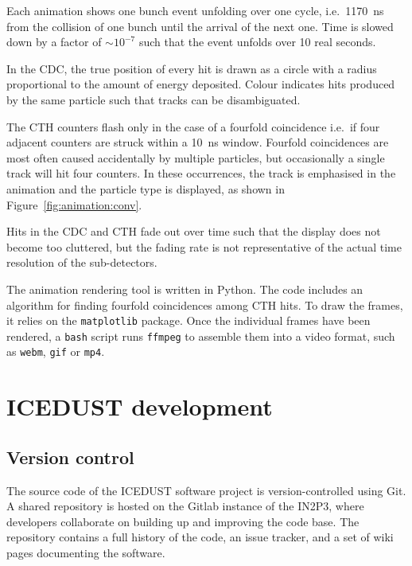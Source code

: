 Each animation shows one bunch event unfolding over one cycle, i.e.\
\SI{1170}{\ns} from the collision of one bunch until the arrival of the next
one. Time is slowed down by a factor of ${\sim}10^{-7}$ such that the event
unfolds over 10 real seconds.

In the CDC, the true position of every hit is drawn as a circle with a radius
proportional to the amount of energy deposited. Colour indicates hits produced
by the same particle such that tracks can be disambiguated.

The CTH counters flash only in the case of a fourfold coincidence i.e.\ if four
adjacent counters are struck within a \SI{10}{\ns} window. Fourfold coincidences
are most often caused accidentally by multiple particles, but occasionally a
single track will hit four counters. In these occurrences, the track is
emphasised in the animation and the particle type is displayed, as shown
in Figure~\ref{fig:animation:conv}.

Hits in the CDC and CTH fade out over time such that the display does not become
too cluttered, but the fading rate is not representative of the actual time
resolution of the sub-detectors.

The animation rendering tool is written in Python. The code includes an
algorithm for finding fourfold coincidences among CTH hits. To draw the frames,
it relies on the \texttt{matplotlib} package. Once the individual frames have
been rendered, a \texttt{bash} script runs \texttt{ffmpeg} to assemble them into
a video format, such as \texttt{webm}, \texttt{gif} or \texttt{mp4}.


\section{ICEDUST development}

\subsection{Version control}

The source code of the ICEDUST software project is version-controlled using Git.
A shared repository is hosted on the Gitlab instance of the IN2P3, where
developers collaborate on building up and improving the code base. The
repository contains a full history of the code, an issue tracker, and a set of
wiki pages documenting the software. 

